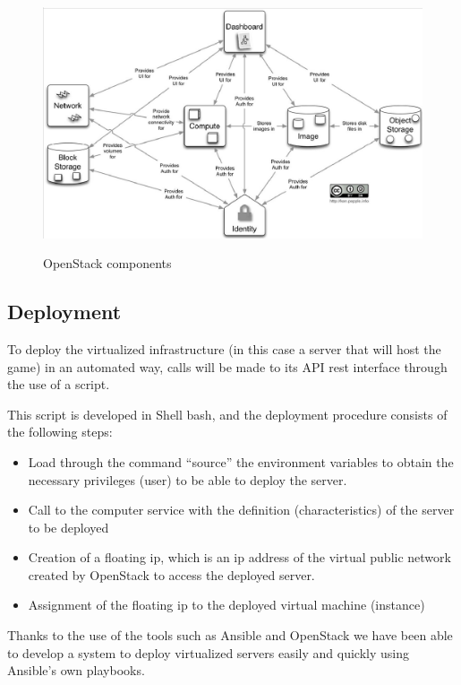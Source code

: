 \documentclass[a4paper,12pt]{report}
\begin{document}
\begin{figure}[h!]
\caption{OpenStack components}
\centering
\includegraphics[width=1\textwidth]{images/Selection_101.png}
\label{fig:planVirt}
\end{figure}

\subsection{Deployment}

To deploy the virtualized infrastructure (in this case a server that will host the game) in an automated way, calls will be made to its API rest interface through the use of a script.

This script is developed in Shell bash, and the deployment procedure consists of the following steps:
\begin{itemize}
\item Load through the command \enquote{source} the environment variables to obtain the necessary privileges (user) to be able to deploy the server.
\item Call to the computer service with the definition (characteristics) of the server to be deployed
\item Creation of a floating ip, which is an ip address of the virtual public network created by OpenStack to access the deployed server.
\item Assignment of the floating ip to the deployed virtual machine (instance)
\end{itemize}

Thanks to the use of the tools such as Ansible and OpenStack we have been able to develop a system to deploy virtualized servers easily and quickly using Ansible's own playbooks.
\end{document}
